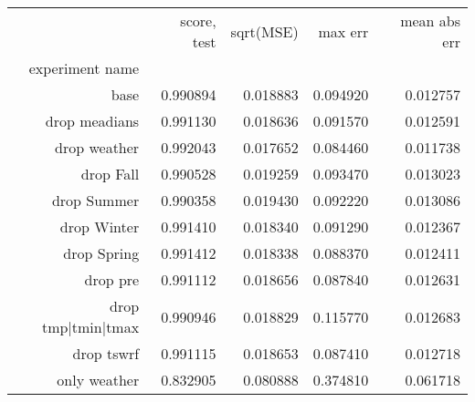 \begin{tabular}{rrrrr}
\toprule
 & score, test & sqrt(MSE) & max err & mean abs err \\
experiment name &  &  &  &  \\
\midrule
base & 0.990894 & 0.018883 & 0.094920 & 0.012757 \\
drop meadians & 0.991130 & 0.018636 & 0.091570 & 0.012591 \\
drop weather & 0.992043 & 0.017652 & 0.084460 & 0.011738 \\
drop Fall & 0.990528 & 0.019259 & 0.093470 & 0.013023 \\
drop Summer & 0.990358 & 0.019430 & 0.092220 & 0.013086 \\
drop Winter & 0.991410 & 0.018340 & 0.091290 & 0.012367 \\
drop Spring & 0.991412 & 0.018338 & 0.088370 & 0.012411 \\
drop pre & 0.991112 & 0.018656 & 0.087840 & 0.012631 \\
drop tmp|tmin|tmax & 0.990946 & 0.018829 & 0.115770 & 0.012683 \\
drop tswrf & 0.991115 & 0.018653 & 0.087410 & 0.012718 \\
only weather & 0.832905 & 0.080888 & 0.374810 & 0.061718 \\
\bottomrule
\end{tabular}
